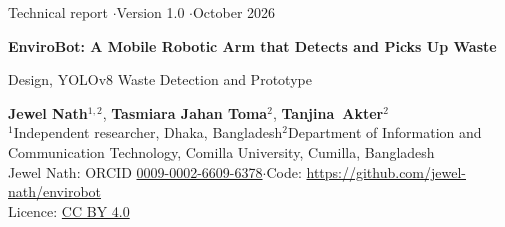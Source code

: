 \documentclass[11pt]{article}
\begin{document}
\thispagestyle{empty}
\begin{tcolorbox}[colback=accent, colframe=accent, arc=3pt, left=14pt, right=14pt, top=14pt, bottom=12pt]
  \color{white}\sffamily\raggedright
  {\small Technical report \quad$\cdot$\quad Version 1.0 \quad$\cdot$\quad October 2026}\par\vspace{8pt}
  {\LARGE\bfseries EnviroBot: A Mobile Robotic Arm that Detects and Picks Up Waste}\par\vspace{6pt}
  {\large Design, YOLOv8 Waste Detection and Prototype}
\end{tcolorbox}

\vspace{4pt}
{\sffamily\raggedright
\textbf{Jewel Nath}$^{1,2}$, \textbf{Tasmiara Jahan Toma}$^{2}$, \mbox{\textbf{Tanjina Akter}$^{2}$}\\[2pt]
{\small\color{muted}$^{1}$Independent researcher, Dhaka, Bangladesh\quad $^{2}$Department of Information and Communication Technology, Comilla University, Cumilla, Bangladesh}\\
{\small\color{muted}Jewel Nath: ORCID \href{https://orcid.org/0009-0002-6609-6378}{0009-0002-6609-6378}\quad$\cdot$\quad Code: \url{https://github.com/jewel-nath/envirobot}}\\
{\small\color{muted}Licence: \href{https://creativecommons.org/licenses/by/4.0/}{CC BY 4.0}}\par}
\end{document}
